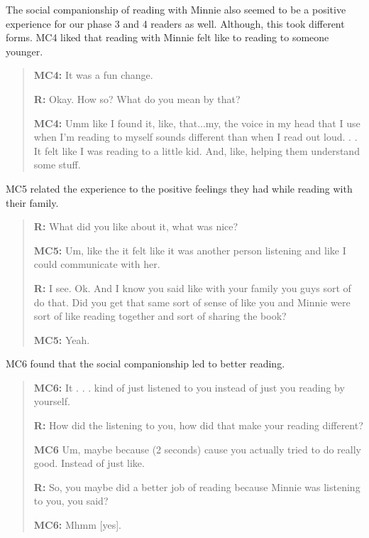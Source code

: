 \documentclass{sigchi}
\begin{document}
 The social companionship of reading with Minnie also seemed to be a positive experience for our phase 3 and 4 readers as well.  Although, this took different forms.  MC4 liked that reading with Minnie felt like to reading to someone younger.
 
 \begin{quote}
 	 \textbf{MC4:} It was a fun change. 
 	 
 	 \textbf{R:} Okay. How so? What do you mean by that?
 	 
 	 \textbf{MC4:} Umm like I found it, like, that...my, the voice in my head that I use when I'm reading to myself sounds different than when I read out loud. . . It felt like I was reading to a little kid. And, like, helping them understand some stuff.
 	 \end{quote}
 	 
MC5 related the experience to the positive feelings they had while reading with their family.

	\begin{quote}
		
		\textbf{R:} What did you like about it, what was nice?
		 
		 \textbf{MC5:} Um, like the it felt like it was another person listening and like I could communicate with her.
		 
		 \textbf{R:} I see. Ok. And I know you said like with your family you 	guys sort of do that. Did you get that same sort of sense of like you and Minnie were sort of like reading together and sort of sharing the book?
		 
		 \textbf{MC5:} Yeah.
	\end{quote}

MC6 found that the social companionship led to better reading.

	\begin{quote} 	
		 \textbf{MC6:} It . . .  kind of just listened to you instead of just you reading by yourself.
		 
		 \textbf{R:} How did the listening to you, how did that make your reading different?
		 
		 \textbf{MC6} Um, maybe because (2 seconds) cause you actually tried to do really good. Instead of just like.
		 
		 \textbf{R:} So, you maybe did a better job of reading because Minnie was listening to you, you said?
		 
		 \textbf{MC6:} Mhmm [yes]. 
 \end{quote}
 
\end{document}
